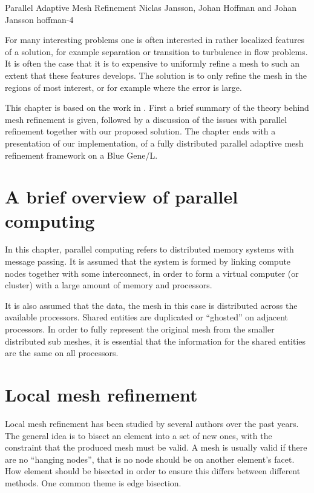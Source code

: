               {Parallel Adaptive Mesh Refinement}
              {Niclas Jansson, Johan Hoffman and Johan Jansson}
              {hoffman-4}

For many interesting problems one is often interested in rather
localized features of a solution, for example separation or transition
to turbulence in flow problems. It is often the case that it is to
expensive to uniformly refine a mesh to such an extent that these
features develops. The solution is to only refine the mesh in the
regions of most interest, or for example where the error is large.

This chapter is based on the work in \cite{Jansson2008}. First a brief
summary of the theory behind mesh refinement is given, followed by a
discussion of the issues with parallel refinement together with our
proposed solution. The chapter ends with a presentation of our
implementation, of a fully distributed parallel adaptive mesh
refinement framework on a Blue Gene/L.


\section{A brief overview of parallel computing}
\label{hoffman-4:sect:para}

In this chapter, parallel computing refers to distributed memory
systems with message passing. It is assumed that the system is formed
by linking compute nodes together with some interconnect, in order to
form a virtual computer (or cluster) with a large amount of memory and
processors.

It is also assumed that the data, the mesh in this case is distributed
across the available processors. Shared entities are duplicated or
``ghosted'' on adjacent processors. In order to fully represent the
original mesh from the smaller distributed sub meshes, it is essential
that the information for the shared entities are the same on all
processors.


\section{Local mesh refinement}

Local mesh refinement has been studied by several authors over the
past years. The general idea is to bisect an element into a set of new
ones, with the constraint that the produced mesh must be
valid. A mesh is usually valid if there are no ``hanging nodes'', that
is no node should be on another element's facet. How element should be
bisected in order to ensure this differs between different
methods. One common theme is edge bisection.

